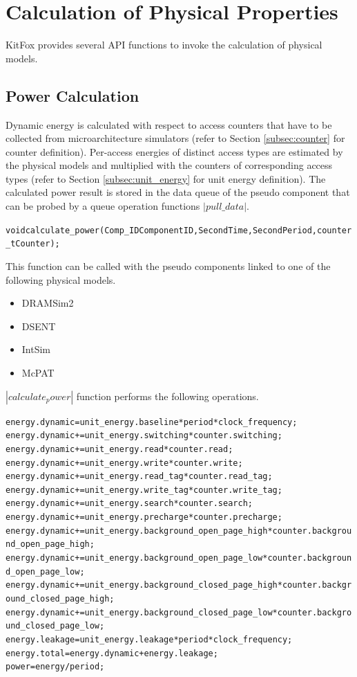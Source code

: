 \section{Calculation of Physical Properties} \label{sec:calculation_of_physical_properties}
\noindent
KitFox provides several API functions to invoke the calculation of physical models.

\subsection{Power Calculation} \label{subsec:power_calculation}
\noindent
Dynamic energy is calculated with respect to access counters that have to be collected from microarchitecture simulators (refer to Section \ref{subsec:counter} for counter definition). 
Per-access energies of distinct access types are estimated by the physical models and multiplied with the counters of corresponding access types (refer to Section \ref{subsec:unit_energy} for unit energy definition). 
The calculated power result is stored in the data queue of the pseudo component that can be probed by a queue operation functions $|pull\_data|$.
{
\fontsize{10pt}{11pt}\selectfont
\begin{alltt}
void calculate_power(Comp_ID ComponentID, Second Time, Second Period, counter_t Counter);
\end{alltt}
}

\noindent
This function can be called with the pseudo components linked to one of the following physical models.
\begin{itemize}
\item{DRAMSim2} \vspace*{-5pt}\leavevmode
\item{DSENT} \vspace*{-5pt}\leavevmode
\item{IntSim} \vspace*{-5pt}\leavevmode
\item{McPAT}
\end{itemize}

\noindent
$|calculate_power|$ function performs the following operations.
{
\fontsize{10pt}{11pt}\selectfont
\begin{alltt}
energy.dynamic = unit_energy.baseline * period * clock_frequency;
energy.dynamic += unit_energy.switching * counter.switching;
energy.dynamic += unit_energy.read * counter.read;
energy.dynamic += unit_energy.write * counter.write;
energy.dynamic += unit_energy.read_tag * counter.read_tag;
energy.dynamic += unit_energy.write_tag * counter.write_tag;
energy.dynamic += unit_energy.search * counter.search;
energy.dynamic += unit_energy.precharge * counter.precharge;
energy.dynamic += unit_energy.background_open_page_high * counter.background_open_page_high;
energy.dynamic += unit_energy.background_open_page_low * counter.background_open_page_low;
energy.dynamic += unit_energy.background_closed_page_high * counter.background_closed_page_high;
energy.dynamic += unit_energy.background_closed_page_low * counter.background_closed_page_low;
energy.leakage = unit_energy.leakage * period * clock_frequency;
energy.total = energy.dynamic + energy.leakage;
power = energy / period;
\end{alltt}
}

